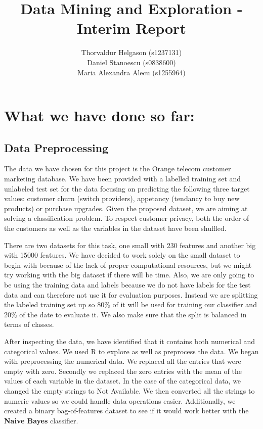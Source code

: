 \documentclass[a4paper,11pt]{article}
\title{Data Mining and Exploration - Interim Report}
\author{Thorvaldur Helgason (s1237131) \\
Daniel Stanoescu (s0838600) \\
Maria Alexandra Alecu (s1255964)}
\begin{document}
    
\maketitle

\section{What we have done so far:}
\subsection{Data Preprocessing}
The data we have chosen for this project is the Orange telecom customer marketing database. We have been provided with a labelled training set and unlabeled test set for the data focusing on predicting the following three target values: customer churn (switch providers), appetancy (tendancy to buy new products) or purchase upgrades. Given the proposed dataset, we are aiming at solving a classification problem. To respect customer privacy, both the order of the customers as well as the variables in the dataset have been shuffled.

There are two datasets for this task, one small with 230 features and another big with 15000 features. We have decided to work solely on the small dataset to begin with because of the lack of proper computational resources, but we might try working with the big dataset if there will be time. Also, we are only going to be using the training data and labels because we do not have labels for the test data and can therefore not use it for evaluation purposes. Instead we are splitting the labeled training set up so 80\% of it will be used for training our classifier and 20\% of the date to evaluate it. We also make sure that the split is balanced in terms of classes.

After inspecting the data, we have identified that it contains both numerical and categorical values. We used R to explore as well as preprocess the data. We began with preprocessing the numerical data. We replaced all the entries that were empty with zero. Secondly we replaced the zero entries with the mean of the values of each variable in the dataset. In the case of the categorical data, we changed the empty strings to Not Available. We then converted all the strings to numeric values so we could handle data operations easier. Additionally, we created a binary bag-of-features dataset to see if it would work better with the \textbf{Naive Bayes} classifier. 
\end{document}
